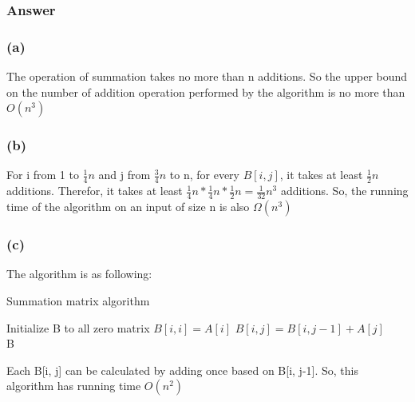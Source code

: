 \documentclass[a4paper]{article}
\begin{document}
\subsubsection*{Answer}
\subsubsection*{(a)}
The operation of summation takes no more than n additions. So the upper bound on the number of addition operation performed by the algorithm is no more than $O(n^3)$
\subsubsection*{(b)}
For i from 1 to $\frac{1}{4}n$ and j from $\frac{3}{4}n$ to n, for every $B[i,j]$, it takes at least $\frac{1}{2}n$ additions. Therefor, it takes at least $\frac{1}{4}n*\frac{1}{4}n*\frac{1}{2}n=\frac{1}{32}n^3$ additions. So, the running time of the algorithm  on an input of size n is also $\Omega(n^3)$
\subsubsection*{(c)}
The algorithm is as following:
\begin{algorithm}[!htb]
	\centering
	\caption{Summation matrix algorithm}
	\begin{algorithmic}[1]
		\State Initialize B to all zero matrix
		\State $B[i,i] = A[i]$
		\State $B[i,j] = B[i,j-1]+A[j]$
		\EndFor
		\EndFor \\
		\Return B
	\end{algorithmic}
\end{algorithm}
\par Each B[i, j] can be calculated by adding once based on B[i, j-1]. So, this algorithm has running time $O(n^2)$
\vspace{2cm}
\end{document}
